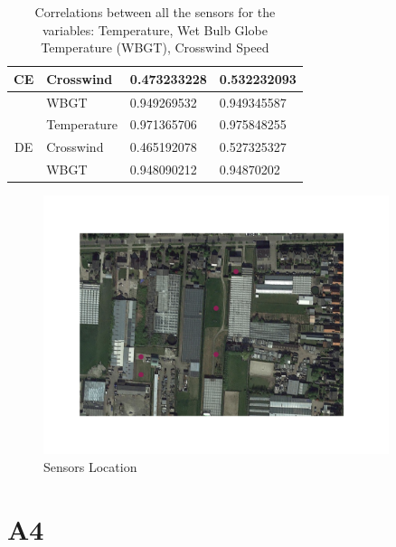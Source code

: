 \documentclass[a4paper,12pt]{article}
\begin{document}
\begin{table}[]
\begin{tabular}{llll}
 		\multicolumn{1}{|c|}{CE}                    & \multicolumn{1}{l|}{Crosswind}   & \multicolumn{1}{l|}{0.473233228}         & \multicolumn{1}{l|}{0.532232093}          \\ \hline
 		\multicolumn{1}{|l|}{}                      & \multicolumn{1}{l|}{WBGT}        & \multicolumn{1}{l|}{0.949269532}         & \multicolumn{1}{l|}{0.949345587}          \\ \hline
 		& Temperature                      & 0.971365706                              & 0.975848255                               \\
 		\multicolumn{1}{c}{DE}                      & Crosswind                        & 0.465192078                              & 0.527325327                               \\
 		& WBGT                             & 0.948090212                              & 0.94870202                               
 	\end{tabular}
 	\caption{Correlations between all the sensors for the variables: Temperature, Wet Bulb Globe Temperature (WBGT), Crosswind Speed\cite{Maiullari2020}}
 \end{table}
  \begin{figure}[H] 
	\centering
	\includegraphics[width=0.9\textwidth]{Sensors Location.png}
	\caption{Sensors Location}
  \end{figure}
\section{A4}
\end{document}
